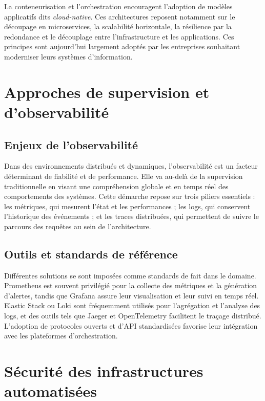 La conteneurisation et l’orchestration encouragent l’adoption de modèles applicatifs dits \emph{cloud-native}. Ces architectures reposent notamment sur le découpage en microservices, la scalabilité horizontale, la résilience par la redondance et le découplage entre l’infrastructure et les applications. Ces principes sont aujourd’hui largement adoptés par les entreprises souhaitant moderniser leurs systèmes d’information.

\section{Approches de supervision et d’observabilité}

\subsection{Enjeux de l’observabilité}

Dans des environnements distribués et dynamiques, l’observabilité est un facteur déterminant de fiabilité et de performance. Elle va au-delà de la supervision traditionnelle en visant une compréhension globale et en temps réel des comportements des systèmes. Cette démarche repose sur trois piliers essentiels : les métriques, qui mesurent l’état et les performances ; les logs, qui conservent l’historique des événements ; et les traces distribuées, qui permettent de suivre le parcours des requêtes au sein de l’architecture.

\subsection{Outils et standards de référence}

Différentes solutions se sont imposées comme standards de fait dans le domaine. Prometheus est souvent privilégié pour la collecte des métriques et la génération d’alertes, tandis que Grafana assure leur visualisation et leur suivi en temps réel. Elastic Stack ou Loki sont fréquemment utilisés pour l’agrégation et l’analyse des logs, et des outils tels que Jaeger et OpenTelemetry facilitent le traçage distribué. L’adoption de protocoles ouverts et d’API standardisées favorise leur intégration avec les plateformes d’orchestration.

\section{Sécurité des infrastructures automatisées}

